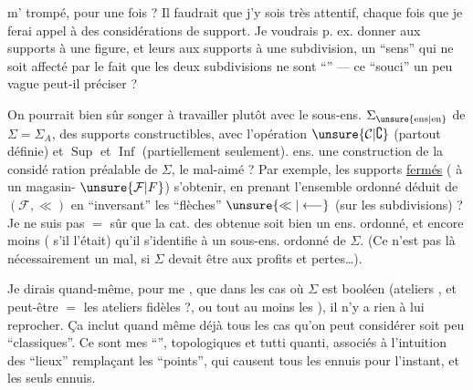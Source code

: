 m' trompé, pour une fois ? Il faudrait que j'y sois très attentif, chaque fois que je ferai appel à des considérations de support. Je voudrais p. ex. donner aux supports  à une figure, et leurs  aux supports  à une subdivision, un ``sens'' qui ne soit affecté par le fait que les deux subdivisions ne sont ``''  --- ce ``souci'' un peu vague peut-il  préciser ?

On pourrait bien sûr songer à travailler plutôt avec le sous-ens. $\Sigma_{\unsure{\mathrm{ens}|\mathrm{en}}}$ de $\Sigma=\Sigma_A$,  des supports  constructibles, avec l'opération $\unsure{\mathcal{C}|\complement}$ (partout définie) et $\operatorname{Sup}$ et $\operatorname{Inf}$ (partiellement  seulement).  ens.  une construction  de la considé%
%
%
ration préalable de $\Sigma$, le mal-aimé ? Par exemple, les supports  \uline{fermés} (  à un magasin- $\unsure{\mathcal{F}|F}$)  s'obtenir, en prenant l'ensemble ordonné déduit de $(\mathcal{F},\ll)$ en ``inversant'' les ``flèches'' $\unsure{\ll|\longleftarrow}$ (sur les subdivisions) ? Je ne suis pas $=$ sûr que la cat. des  obtenue soit bien un ens. ordonné, et encore moins ( s'il l'était) qu'il  s'identifie à un sous-ens. ordonné de $\Sigma$. (Ce n'est pas là nécessairement un mal, si $\Sigma$ devait être  aux profits et pertes\ldots).

Je dirais quand-même, pour me , que dans les cas où $\Sigma$ est booléen (ateliers , et peut-être $=$ les ateliers fidèles ?, ou tout au moins  les ), il n'y a rien à lui reprocher. Ça inclut quand même déjà tous les cas qu'on peut
considérer  soit peu ``classiques''. Ce sont mes ``'',  topologiques et tutti quanti, associés à l'intuition des ``lieux'' remplaçant les ``points'', qui causent tous les ennuis pour l'instant, et les seuls ennuis.

